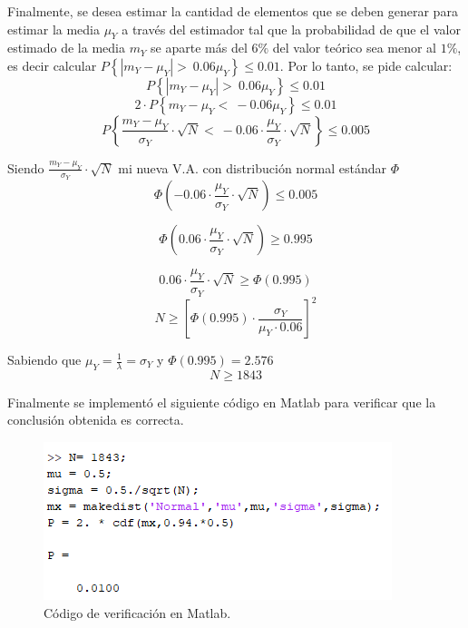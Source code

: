 Finalmente, se desea estimar la cantidad de elementos que se deben generar para estimar la media $\mu_Y$ a través del estimador tal que la probabilidad de que el valor estimado de la media $m_Y$ se aparte más del $6\%$ del valor teórico sea menor al $1\%$, es decir calcular $P\left\lbrace | m_Y - \mu_Y | > \ 0.06 \mu_Y \right\rbrace \leq 0.01$. %
%
Por lo tanto, se pide calcular: 
\begin{equation*}
	P\left\lbrace | m_Y - \mu_Y | > \ 0.06 \mu_Y \right\rbrace \leq 0.01
\end{equation*}
\begin{equation*}
	2\cdot P\left\lbrace m_Y - \mu_Y < \ -0.06 \mu_Y \right\rbrace \leq 0.01
\end{equation*}
\begin{equation*}
	P\left\lbrace  \frac{m_Y - \mu_Y}{\sigma_Y}\cdot \sqrt{N} < \ -0.06 \cdot \frac{\mu_Y}{\sigma_Y}\cdot \sqrt{N} \right\rbrace \leq 0.005
\end{equation*}

Siendo $\frac{m_Y - \mu_Y}{\sigma_Y}\cdot \sqrt{N}$ mi nueva V.A. con distribución normal estándar $\Phi$
\begin{equation*}
\Phi\left( -0.06 \cdot \frac{\mu_Y}{\sigma_Y}\cdot \sqrt{N} \right) \leq 0.005
\end{equation*}

\begin{equation*}
\Phi\left( 0.06 \cdot \frac{\mu_Y}{\sigma_Y}\cdot \sqrt{N} \right) \geq 0.995
\end{equation*}

\begin{equation*}
 0.06 \cdot \frac{\mu_Y}{\sigma_Y}\cdot \sqrt{N} \geq \Phi \left( 0.995 \right)
\end{equation*}
\begin{equation*}
	N \geq \left[ \Phi \left( 0.995 \right) \cdot \frac{\sigma_Y}{\mu_Y \cdot 0.06}\right]^2
\end{equation*}

Sabiendo que $\mu_Y = \frac{1}{\lambda} = \sigma_Y$ y $\Phi \left( 0.995 \right)=2.576$
\begin{equation}
N \geq 1843 
\end{equation}

Finalmente se implementó el siguiente código en Matlab para verificar que la conclusión obtenida es correcta. 
\begin{figure}[H]
	\centering
	\includegraphics[width=0.4\linewidth]{./ImagenesEjercicio1/implemetacion.PNG}
	\caption{Código de verificación en Matlab.}
	\label{fig:imple}
\end{figure}